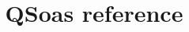 \documentclass{article}
\title{QSoas reference}
\begin{document}
\maketitle

\small
\tableofcontents

\medskip
\end{document}
